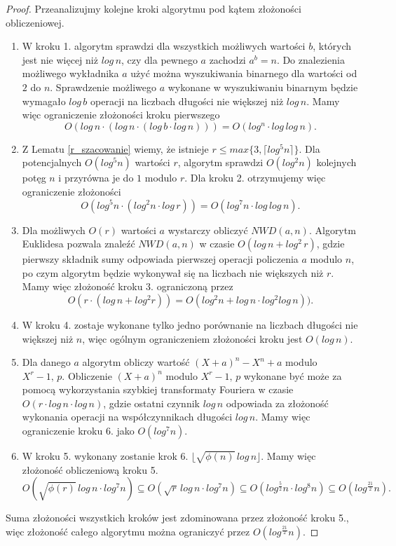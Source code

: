 \documentclass[declaration,shortabstract]{iithesis}
\theoremstyle{definition}
\theoremstyle{remark} \newtheorem{observation}{Obserwacja}
\theoremstyle{plain} \newtheorem{theorem}{Twierdzenie}
\theoremstyle{plain} \newtheorem{lemma}{Lemat}
\theoremstyle{remark} \newtheorem*{remark*}{Uwaga}
\theoremstyle{reminder} \newtheorem*{reminder*}{Przypomnienie}
\begin{document}
\begin{proof}
	Przeanalizujmy kolejne kroki algorytmu pod kątem złożoności obliczeniowej.
	\begin{enumerate}[label=(krok \arabic*.),leftmargin=.4in]
		\item W kroku 1. algorytm sprawdzi dla wszystkich możliwych wartości $b$, których jest nie więcej niż $log\,n$, czy dla pewnego $a$ zachodzi $a^b = n$. Do znalezienia możliwego wykładnika $a$ użyć można wyszukiwania binarnego dla wartości od $2$ do $n$. Sprawdzenie możliwego $a$ wykonane w wyszukiwaniu binarnym będzie wymagało $log \, b$ operacji na liczbach długości nie większej niż $log \, n$. Mamy więc ograniczenie złożoności kroku pierwszego \[O(log \, n \cdot (log \,n \cdot (log \,b \cdot log \,n ))) = O(log^n \cdot log \, log \, n).\]
		\item Z Lematu \ref{r_szacowanie} wiemy, że istnieje $r \leq max\{3, \lceil log^5n \rceil \}$. Dla potencjalnych $O(log^5n)$ wartości $r$, algorytm sprawdzi $O(log^2n)$ kolejnych potęg $n$ i przyrówna je do $1$ modulo $r$. Dla kroku 2. otrzymujemy więc ograniczenie złożoności \[O(log^5n \cdot (log^2n \cdot log \,r)) = O(log^7n \cdot log\,log \,n).\]
		\item Dla możliwych $O(r)$ wartości $a$ wystarczy obliczyć $NWD(a, n)$. Algorytm Euklidesa pozwala znaleźć $NWD(a, n)$ w czasie $O(log \,n + log ^2 \, r)$, gdzie pierwszy składnik sumy odpowiada pierwszej operacji policzenia $a$ modulo $n$, po czym algorytm będzie wykonywał się na liczbach nie większych niż $r$. Mamy więc złożoność kroku 3. ograniczoną przez \[O(r \cdot (log \, n + log^2r)) = O(log^2n + log\,n \cdot log^2log \, n)).\] 
		\item W kroku 4. zostaje wykonane tylko jedno porównanie na liczbach długości nie większej niż $n$, więc ogólnym ograniczeniem złożoności kroku jest $O(log\,n)$.
		\item Dla danego $a$ algorytm obliczy wartość $(X + a)^n - X^n + a$ modulo $X^r - 1, \, p$. Obliczenie $(X + a)^n$ modulo $X^r - 1, \, p$ wykonane być może za pomocą wykorzystania szybkiej transformaty Fouriera w czasie $O(r \cdot log \, n \cdot log \, n)$, gdzie ostatni czynnik $log \, n$ odpowiada za złożoność wykonania operacji na współczynnikach długości $log \, n$. Mamy więc ograniczenie kroku 6. jako $O(log^7n)$.
		      \addtocounter{enumi}{-2}
		\item W kroku 5. wykonany zostanie krok 6. $\lfloor \sqrt{\phi(n)} \, log \, n \rfloor$. Mamy więc złożoność obliczeniową kroku 5. \[O(\sqrt{\phi(r)} \, log \, n \cdot log^7n) \subseteq O(\sqrt{r} \, log \, n \cdot log^7n) \subseteq O(log^{\frac{5}{2}}n \cdot log^8n) \subseteq O(log^{\frac{21}{2}}n).\]
	\end{enumerate}				
	Suma złożoności wszystkich kroków jest zdominowana przez złożoność kroku 5., więc złożoność całego algorytmu można ograniczyć przez $O(log^{\frac{21}{2}}n)$.
\end{proof}
	
\end{document}
